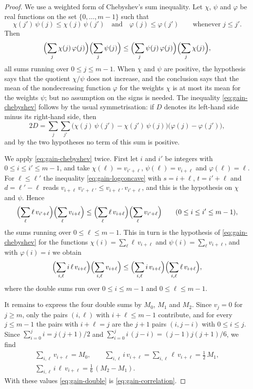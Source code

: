 \documentclass{amsart}
\theoremstyle{definition}
\theoremstyle{remark}
\numberwithin{equation}{section}
\begin{document}
\begin{proof}
We use a weighted form of Chebyshev's sum inequality. Let $\chi$, $\psi$ and
$\varphi$ be real functions on the set $\{0,\dots,m-1\}$ such that
\[
\chi(j')\,\psi(j)\le\chi(j)\,\psi(j')\quad\text{and}\quad
\varphi(j)\le\varphi(j')\qquad\text{whenever }j\le j'.
\]
Then
\begin{equation}\label{eq:gain-chebyshev}
\Bigl(\sum_{j}\chi(j)\,\varphi(j)\Bigr)\Bigl(\sum_{j}\psi(j)\Bigr)
\le\Bigl(\sum_{j}\psi(j)\,\varphi(j)\Bigr)\Bigl(\sum_{j}\chi(j)\Bigr),
\end{equation}
all sums running over $0\le j\le m-1$. When $\chi$ and $\psi$ are positive,
the hypothesis says that the quotient $\chi/\psi$ does not increase, and the
conclusion says that the mean of the nondecreasing function $\varphi$ for the
weights $\chi$ is at most its mean for the weights $\psi$; but no assumption
on the signs is needed. The inequality \eqref{eq:gain-chebyshev} follows by
the usual symmetrisation: if $D$ denotes its left-hand side minus its
right-hand side, then
\[
2D=\sum_{j}\sum_{j'}\bigl(\chi(j)\,\psi(j')-\chi(j')\,\psi(j)\bigr)
\bigl(\varphi(j)-\varphi(j')\bigr),
\]
and by the two hypotheses no term of this sum is positive.

We apply \eqref{eq:gain-chebyshev} twice. First let $i$ and $i'$ be integers
with $0\le i\le i'\le m-1$, and take $\chi(\ell)=v_{i'+\ell}$,
$\psi(\ell)=v_{i+\ell}$ and $\varphi(\ell)=\ell$. For $\ell\le\ell'$ the
inequality \eqref{eq:gain-logconcave} with $s=i+\ell$, $t=i'+\ell$ and
$d=\ell'-\ell$ reads
$v_{i+\ell}\,v_{i'+\ell'}\le v_{i+\ell'}\,v_{i'+\ell}$, and this is the
hypothesis on $\chi$ and $\psi$. Hence
\[
\Bigl(\sum_{\ell}\ell\,v_{i'+\ell}\Bigr)\Bigl(\sum_{\ell}v_{i+\ell}\Bigr)
\le\Bigl(\sum_{\ell}\ell\,v_{i+\ell}\Bigr)\Bigl(\sum_{\ell}v_{i'+\ell}\Bigr)
\qquad(0\le i\le i'\le m-1),
\]
the sums running over $0\le\ell\le m-1$. This in turn is the hypothesis of
\eqref{eq:gain-chebyshev} for the functions
$\chi(i)=\sum_{\ell}\ell\,v_{i+\ell}$ and $\psi(i)=\sum_{\ell}v_{i+\ell}$,
and with $\varphi(i)=i$ we obtain
\begin{equation}\label{eq:gain-double}
\Bigl(\sum_{i,\ell}i\,\ell\,v_{i+\ell}\Bigr)\Bigl(\sum_{i,\ell}v_{i+\ell}\Bigr)
\le\Bigl(\sum_{i,\ell}i\,v_{i+\ell}\Bigr)
\Bigl(\sum_{i,\ell}\ell\,v_{i+\ell}\Bigr),
\end{equation}
where the double sums run over $0\le i\le m-1$ and $0\le\ell\le m-1$.

It remains to express the four double sums by $M_0$, $M_1$ and $M_2$. Since
$v_j=0$ for $j\ge m$, only the pairs $(i,\ell)$ with $i+\ell\le m-1$
contribute, and for every $j\le m-1$ the pairs with $i+\ell=j$ are the $j+1$
pairs $(i,j-i)$ with $0\le i\le j$. Since $\sum_{i=0}^{j}i=j(j+1)/2$ and
$\sum_{i=0}^{j}i\,(j-i)=(j-1)j(j+1)/6$, we find
\begin{gather*}
\sum_{i,\ell}v_{i+\ell}=M_0,\qquad
\sum_{i,\ell}i\,v_{i+\ell}=\sum_{i,\ell}\ell\,v_{i+\ell}=\tfrac12\,M_1,\\
\sum_{i,\ell}i\,\ell\,v_{i+\ell}=\tfrac16\,(M_2-M_1).
\end{gather*}
With these values \eqref{eq:gain-double} is \eqref{eq:gain-correlation}.


\end{proof}
\end{document}
